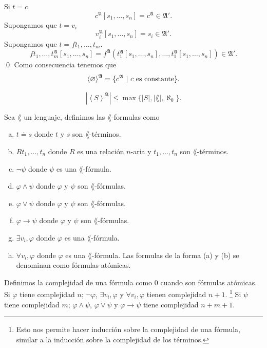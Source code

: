 Si $t = c$
\[ c^{\mathfrak{A}} [s_1, \dots, s_n] = c^{\mathfrak{A}} \in \mathfrak{A}'. \]
Supongamos que $t = v_i$
\[ v_i^{\mathfrak{A}} [s_1, \dots, s_n] = s_i \in \mathfrak{A}'. \]
Supongamos que $t = f t_1, \dots, t_m$.
\[ f t_1, \dots, t_m^{\mathfrak{A}} [s_1, \dots, s_n] = f^{\mathfrak{A}} (t_1^{\mathfrak{A}} [s_1, \dots, s_n], \dots, t_1^{\mathfrak{A}} [s_1, \dots, s_n]) \in \mathfrak{A}'. \] \qed \newline
Como consecuencia tenemos que
\[ \left< \varnothing \right>^{\mathfrak{A}} = \{ c^{\mathfrak{A}} \ | \ c \text{ es constante} \}. \]
\newpage
\begin{corollary}
  \[ \left| \left< S \right>^{\mathfrak{A}} \right| \leq \max \{ |S|, |\lang|, \aleph_0 \}. \]
\end{corollary}
\begin{definition}
  Sea $\lang$ un lenguaje, definimos las $\lang$-formulas como
  \begin{enumerate}[(a)]
  \item 
    $t \doteq s$ donde $t$ y $s$ son $\lang$-t\'erminos.
  \item
    $R t_1, \dots, t_n$ donde $R$ es una relaci\'on $n$-aria y $t_1, \dots, t_n$ son $\lang$-t\'erminos.
  \item
    $\neg \psi$ donde $\psi$ es una $\lang$-f\'ormula.
  \item
    $\varphi \land \psi$ donde $\varphi$ y $\psi$ son $\lang$-f\'ormulas.
  \item
    $\varphi \lor \psi$ donde $\varphi$ y $\psi$ son $\lang$-f\'ormulas.
  \item
    $\varphi \to \psi$ donde $\varphi$ y $\psi$ son $\lang$-f\'ormulas.
  \item
    $\exists v_i, \varphi$ donde $\varphi$ es una $\lang$-f\'ormula.
  \item
    $\forall v_i, \varphi$ donde $\varphi$ es una $\lang$-f\'ormula.
    Las formulas de la forma (a) y (b) se denominan como f\'ormulas at\'omicas.
  \end{enumerate}
  Definimos la complejidad de una f\'ormula como $0$ cuando son f\'ormulas at\'omicas.
  Si $\varphi$ tiene complejidad $n$; $\neg \varphi$, $\exists v_i, \varphi$ y $\forall v_i, \varphi$ tienen complejidad $n+1$.
  \footnote{Esto nos permite hacer inducci\'on sobre la complejidad de una f\'ormula, similar a la inducci\'on sobre la complejidad de los t\'erminos.}
  Si $\psi$ tiene complejidad $m$; $\varphi \land \psi$, $\varphi \lor \psi$ y $\varphi \to \psi$ tiene complejidad $n+m+1$.
\end{definition}
